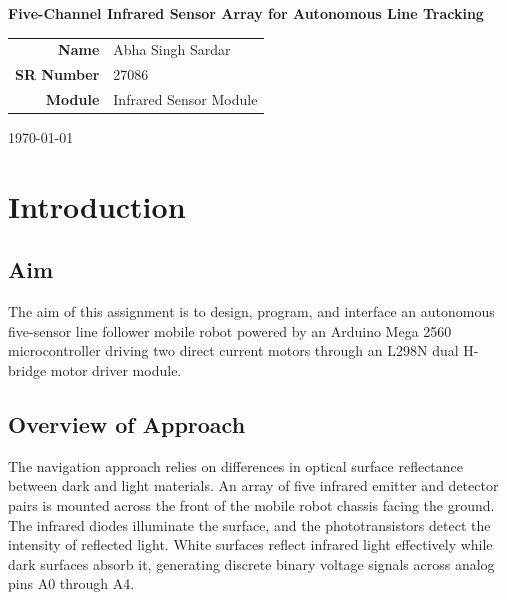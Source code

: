 \documentclass[11pt,a4paper]{article}
\begin{document}
\begin{titlepage}
\centering
\vspace*{3cm}
{\Huge\bfseries Five-Channel Infrared Sensor Array for Autonomous Line Tracking \par}
\vspace{2cm}
{\large
\begin{tabular}{rl}
\textbf{Name}      & Abha Singh Sardar  \\[6pt]
\textbf{SR Number} & 27086             \\[6pt]
\textbf{Module}    & Infrared Sensor Module \\[6pt]
\end{tabular}\par}
\vspace{2.5cm}
{\large \today \par}
\vfill
\end{titlepage}

\newpage
{}

\section{Introduction}

\subsection{Aim}
The aim of this assignment is to design, program, and interface an autonomous five-sensor line follower mobile robot powered by an Arduino Mega 2560 microcontroller driving two direct current motors through an L298N dual H-bridge motor driver module.

\subsection{Overview of Approach}
The navigation approach relies on differences in optical surface reflectance between dark and light materials. An array of five infrared emitter and detector pairs is mounted across the front of the mobile robot chassis facing the ground. The infrared diodes illuminate the surface, and the phototransistors detect the intensity of reflected light. White surfaces reflect infrared light effectively while dark surfaces absorb it, generating discrete binary voltage signals across analog pins A0 through A4.
\end{document}
